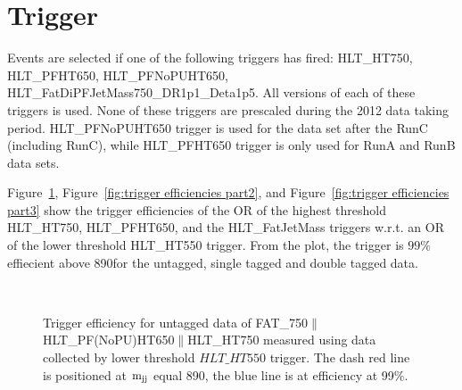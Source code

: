 \newpage

\section{Trigger}
\label{sec:trigger1}


Events are selected if one of the following triggers has fired: HLT\_HT750, HLT\_PFHT650, HLT\_PFNoPUHT650, 
HLT\_FatDiPFJetMass750\_DR1p1\_Deta1p5.  All versions of each of these triggers is used. None of these triggers are prescaled during the 2012 data taking period. HLT\_PFNoPUHT650 trigger is used for the data set after the RunC (including RunC), while HLT\_PFHT650
trigger is only used for RunA and RunB data sets.

Figure~\ref{fig:trigger efficiencies part1}, Figure~\ref{fig:trigger efficiencies part2}, and Figure~\ref{fig:trigger efficiencies part3} show the trigger efficiencies of the OR of the highest threshold
HLT\_HT750, HLT\_PFHT650, and the HLT\_FatJetMass triggers w.r.t. an OR of the lower threshold HLT\_HT550 trigger. From the plot, the trigger is $99\%$ effiecient above 890\GeVcc for the untagged, single tagged and double tagged data. 


\begin{figure}[htb]
\centering
      \\   
\caption[Trigger efficiencies]{Trigger efficiency for untagged data of FAT\_750$\parallel$HLT\_PF(NoPU)HT650$\parallel$HLT\_HT750 measured using data collected by lower threshold 
$HLT\_HT550$ trigger. The dash red line is positioned at ${\rm m_{jj}}$ equal 890\GeVcc, the blue line is at efficiency at 99$\%$. }
  \label{fig:trigger efficiencies part1}
\end{figure}

